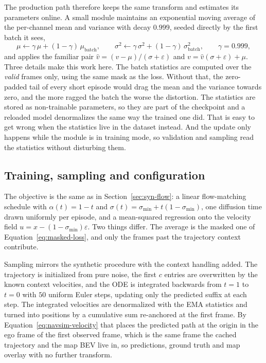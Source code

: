 The production path therefore keeps the same transform and estimates its
parameters online. A small module maintains an exponential moving average of the
per-channel mean and variance with decay $0.999$, seeded directly by the first
batch it sees,
\begin{equation}
\mu \leftarrow \gamma\,\mu + (1-\gamma)\,\mu_{\text{batch}},
\qquad
\sigma^2 \leftarrow \gamma\,\sigma^2 + (1-\gamma)\,\sigma^2_{\text{batch}},
\qquad \gamma = 0.999,
\label{eq:ema}
\end{equation}
and applies the familiar pair
$\hat v=(v-\mu)/(\sigma+\varepsilon)$ and $v=\hat v(\sigma+\varepsilon)+\mu$.
Three details make this work here. The batch statistics are computed over the
\emph{valid} frames only, using the same mask as the loss. Without that, the
zero-padded tail of every short episode would drag the mean and the variance
towards zero, and the more ragged the batch the worse the distortion. The
statistics are stored as non-trainable parameters, so they are part of the
checkpoint and a reloaded model denormalizes the same way the trained one did.
That is easy to get wrong when the statistics live in the dataset instead. And
the update only happens while the module is in training mode, so validation and
sampling read the statistics without disturbing them.

\subsection{Training, sampling and configuration}
\label{sec:navsim-training}

The objective is the same as in Section~\ref{sec:syn-flow}: a linear
flow-matching schedule with $\alpha(t)=1-t$ and
$\sigma(t)=\sigma_{\min}+t(1-\sigma_{\min})$, one diffusion time drawn uniformly
per episode, and a mean-squared regression onto the velocity field
$u=x-(1-\sigma_{\min})\varepsilon$. Two things differ. The average is the masked
one of Equation~\eqref{eq:masked-loss}, and only the frames past the trajectory
context contribute.

Sampling mirrors the synthetic procedure with the context handling added. The
trajectory is initialized from pure noise, the first $c$ entries are overwritten
by the known context velocities, and the ODE is integrated backwards from $t=1$
to $t=0$ with $50$ uniform Euler steps, updating only the predicted suffix at
each step. The integrated velocities are denormalized with the EMA statistics and
turned into positions by a cumulative sum re-anchored at the first frame. By
Equation~\eqref{eq:navsim-velocity} that places the predicted path at the origin
in the ego frame of the first observed frame, which is the same frame the cached
trajectory and the map BEV live in, so predictions, ground truth and map overlay
with no further transform.

